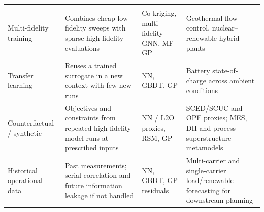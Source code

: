 \begin{table}[!t]
\begin{tabularx}{\textwidth}{@{}L{0.18\textwidth} L{0.30\textwidth} L{0.20\textwidth} L{0.26\textwidth}@{}}
        \cite{Griffith2025,Chen2025244,Chakrabarty2021,Uhrich2026211,Matta2026} \\
    Multi-fidelity training
      & Combines cheap low-fidelity sweeps with sparse high-fidelity evaluations
      & Co-kriging, multi-fidelity GNN, MF GP
      & Geothermal flow control, nuclear--renewable hybrid plants
        \cite{Chen2025244,Chung2023} \\
    Transfer learning
      & Reuses a trained surrogate in a new context with few new runs
      & NN, GBDT, GP
      & Battery state-of-charge across ambient conditions
        \cite{Chen202514792} \\
    Counterfactual / synthetic
      & Objectives and constraints from repeated high-fidelity model runs at prescribed inputs
      & NN / L2O proxies, RSM, GP
      & SCED/SCUC and OPF proxies; MES, DH and process superstructure metamodels
        \cite{Liu20223726,Wu2022231,Liu201914569,Sánchez-Zabala2024,Granacher20221573} \\
    Historical operational data
      & Past measurements; serial correlation and future information leakage if not handled
      & NN, GBDT, GP residuals
      & Multi-carrier and single-carrier load/renewable forecasting for downstream planning
        \cite{Shi2024__2,Dong2024,Koschwitz2018134,Bianchi2020244,Eseye201991463} \\
    \bottomrule
  \end{tabularx}
\end{table}
